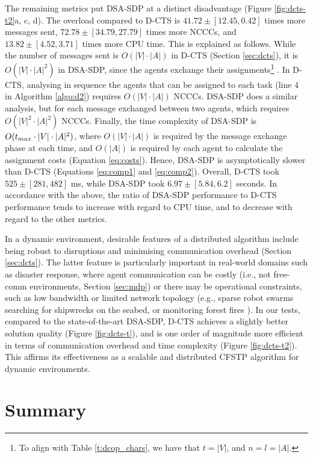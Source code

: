 The remaining metrics put DSA-SDP at a distinct disadvantage (Figure \ref{fig:dcts-t2}a,
c, d). The overload compared to D-CTS is $41.72 \pm [12.45, 0.42]$ times more messages
sent, $72.78 \pm [34.79, 27.79]$ times more NCCCs, and $13.82 \pm [4.52, 3.71]$ times more
CPU time. This is explained as follows. While the number of messages sent is $O(|V| \cdot
|A|)$ in D-CTS (Section \ref{sec:dcts}), it is $O(|V| \cdot |A|^2)$ in DSA-SDP, since the
agents exchange their assignments\footnote{To align with Table \ref{t:dcop_chars}, we have
that $t = |V|$, and $n = l = |A|$.} \cite{zivan2014}. In D-CTS, analysing in sequence the
agents that can be assigned to each task (line $4$ in Algorithm \ref{algo:d2}) requires
$O(|V| \cdot |A|)$ NCCCs. DSA-SDP does a similar analysis, but for each message exchanged
between two agents, which requires $O(|V|^2 \cdot |A|^2)$ NCCCs. Finally, the time
complexity of DSA-SDP is $O(t_{max} \cdot |V| \cdot |A|^2)$, where $O(|V| \cdot |A|)$ is
required by the message exchange phase at each time, and $O(|A|)$ is required by each
agent to calculate the assignment costs (Equation \ref{eq:costs}). Hence, DSA-SDP is
asymptotically slower than D-CTS (Equations \ref{eq:comp1} and \ref{eq:comp2}). Overall,
D-CTS took $525 \pm [281, 482]$ ms, while DSA-SDP took $6.97 \pm [5.84, 6.2]$ seconds. In
accordance with the above, the ratio of DSA-SDP performance to D-CTS performance tends to
increase with regard to CPU time, and to decrease with regard to the other metrics.

In a dynamic environment, desirable features of a distributed algorithm include being
robust to disruptions and minimising communication overhead (Section \ref{sec:dcts}).
The latter feature is particularly important in real-world domains such as disaster
response, where agent communication can be costly (i.e., not free-comm environments,
Section \ref{sec:mdp}) or there may be operational constraints, such as low bandwidth or
limited network topology (e.g., sparse robot swarms searching for shipwrecks on the
seabed, or monitoring forest fires \cite{tarapore2020}). In our tests, compared to the
state-of-the-art DSA-SDP, D-CTS achieves a slightly better solution quality (Figure
\ref{fig:dcts-t}), and is one order of magnitude more efficient in terms of communication
overhead and time complexity (Figure \ref{fig:dcts-t2}). This affirms its effectiveness as
a scalable and distributed CFSTP algorithm for dynamic environments.

\section{Summary}

